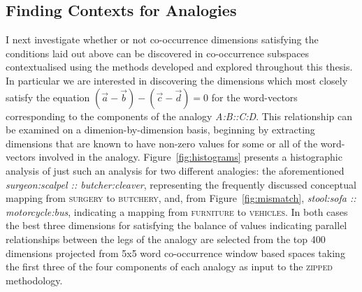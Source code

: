 \subsection{Finding Contexts for Analogies} \label{sec:finding}
I next investigate whether or not co-occurrence dimensions satisfying the conditions laid out above can be discovered in co-occurrence subspaces contextualised using the methods developed and explored throughout this thesis.  In particular we are interested in discovering the dimensions which most closely satisfy the equation $(\overrightarrow{a} - \overrightarrow{b}) - (\overrightarrow{c} - \overrightarrow{d}) = 0$ for the word-vectors corresponding to the components of the analogy \emph{A:B::C:D}.  This relationship can be examined on a dimenion-by-dimension basis, beginning by extracting dimensions that are known to have non-zero values for some or all of the word-vectors involved in the analogy.  Figure~\ref{fig:histograms} presents a histographic analysis of just such an analysis for two different analogies: the aforementioned \emph{surgeon:scalpel :: butcher:cleaver}, representing the frequently discussed conceptual mapping from \textsc{surgery} to \textsc{butchery}, and, from Figure~\ref{fig:mismatch}, \emph{stool:sofa :: motorcycle:bus}, indicating a mapping from \textsc{furniture} to \textsc{vehicles}.  In both cases the best three dimensions for satisfying the balance of values indicating parallel relationships between the legs of the analogy are selected from the top 400 dimensions projected from 5x5 word co-occurrence window based spaces taking the first three of the four components of each analogy as input to the \textsc{zipped} methodology.

